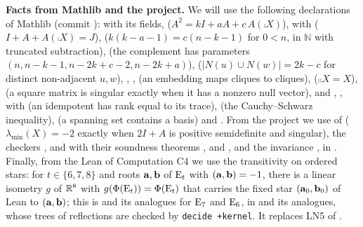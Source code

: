 \begingroup\raggedright
\medskip\noindent\textbf{Facts from Mathlib and the project.}\label{facts:414}
We will use the following declarations of Mathlib (commit ):
 with its fields,
 ($A^2=kI+aA+c\,A(\comp X)$),
 with
 ($I+A+A(\comp X)=J$),
 ($k(k-a-1)=c(n-k-1)$ for $0<n$, in $\mathbb N$ with truncated
subtraction),
 (the complement has parameters
$(n,n-k-1,n-2k+c-2,n-2k+a)$),
 ($|N(u)\cup N(w)|=2k-c$ for
distinct non-adjacent $u,w$),
,
,  (an
embedding maps cliques to cliques),  ($\comp{\comp X}=X$),
 (a square matrix is singular exactly when it has a
nonzero null vector),  and ,
,
 with  (an
idempotent has rank equal to its trace),  (the Cauchy--Schwarz
inequality),  (a spanning set contains a basis) and
. From the project we use
 of
 ($\lambda_{\min}(X)=-2$ exactly when $2I+A$ is
positive semidefinite and singular), the checkers ,  and
 with their soundness theorems
,  and
,
and the invariance , in
. Finally, from the Lean of Computation
C4 we use the transitivity on ordered stars: for $t\in\{6,7,8\}$ and roots ${\mathbf a},{\mathbf b}$ of
$\mathrm{E}_t$ with $({\mathbf a},{\mathbf b})=-1$, there is a linear isometry $g$ of ${\mathbb R}^8$ with
$g(\Phi(\mathrm{E}_t))=\Phi(\mathrm{E}_t)$ that carries the fixed star $({\mathbf a}_0,{\mathbf b}_0)$ of Lean to
$({\mathbf a},{\mathbf b})$; this is 
and its analogues for $\mathrm{E}_7$ and $\mathrm{E}_6$, in
 and its analogues, whose trees of reflections are
checked by \texttt{decide +kernel}. It replaces LN5 of .
\par
\endgroup

